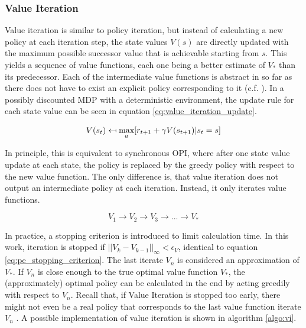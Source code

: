\subsubsection{Value Iteration}
\label{sec:VI}
Value iteration is similar to policy iteration, but instead of calculating a new policy at each iteration step, the state values $V(s)$ are directly updated with the maximum possible successor value that is achievable starting from $s$. This yields a sequence of value functions, each one being a better estimate of $V_*$ than its predecessor. Each of the intermediate value functions is abstract in so far as there does not have to exist an explicit policy corresponding to it (c.f. \cite[lecture~3]{Silver2015}). In a possibly discounted MDP with a deterministic environment, the update rule for each state value can be seen in equation \ref{eq:value_iteration_update}.

\begin{equation}
V(s_t) \mathrel{\reflectbox{\ensuremath{\mapsto}}} 
\underset{a}{\text{max}}[r_{t+1}+\gamma V(s_{t+1})|s_t=s]
\label{eq:value_iteration_update}
\end{equation}

In principle, this is equivalent to synchronous OPI, where after one state value update at each state, the policy is replaced by the greedy policy with respect to the new value function. The only difference is, that value iteration does not output an intermediate policy at each iteration. Instead, it only iterates value functions. 

\begin{equation*}
V_1 \longrightarrow V_2 \longrightarrow V_3 \longrightarrow ... \longrightarrow  V_*
\label{eq:vi_scheme}
\end{equation*}

In practice, a stopping criterion is introduced to limit calculation time. In this work, iteration is stopped if $||V_{k}-V_{k-1}||_\infty<\epsilon_V$, identical to equation \ref{eq:pe_stopping_criterion}. The last iterate $V_n$ is considered an approximation of $V_*$. If $V_n$ is close enough to the true optimal value function $V_*$, the (approximately) optimal policy can be calculated in the end by acting greedily with respect to $V_n$. Recall that, if Value Iteration is stopped too early, there might not even be a real policy that corresponds to the last value function iterate $V_n$ \cite[lecture~3]{Silver2015}. A possible implementation of value iteration is shown in algorithm \ref{algo:vi}.

